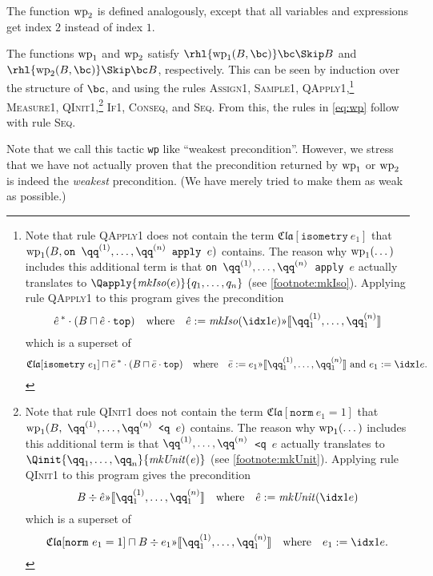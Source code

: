 \documentclass{article}
\renewcommand\ruleref[1]{rule \hbox{\textsc{#1}}}
\renewcommand\rulerefx[1]{\hbox{\textsc{#1}}}
\begin{document}
The function $\operatorname{wp}_2$
is defined analogously, except that all variables and expressions get
index $2$ instead of index $1$.

\medskip

The functions $\operatorname{wp}_1$
and $\operatorname{wp}_2$
satisfy $\rhl{\WP_1(B,\bc)}\bc\Skip B$
and $\rhl{\WP_2(B,\bc)}\Skip\bc B$,
respectively. This can be seen by induction over the structure of
$\bc$,
and using the rules \rulerefx{Assign1}, \rulerefx{Sample1},
\rulerefx{QApply1},\footnote{\label{footnote:wp.qapply}%
  Note that \ruleref{QApply1} does not
  contain the term $\mathfrak{Cla}[\mathtt{isometry}\ e_1]$
  that $\WP_1(B,\texttt{on $\qq^{(1)},\dots,\qq^{(n)}$
    apply $e$})$
  contains.  The reason why $\operatorname{wp}_1(\dots)$
  includes this additional term is that \texttt{on
    $\qq^{(1)},\dots,\qq^{(n)}$
    apply $e$}
  actually translates to $\Qapply{\mathit{mkIso}(e)}{q_1,\dots,q_n}$
  (see \autoref{footnote:mkIso}). Applying \ruleref{QApply1} to this
  program
  gives the precondition
  \[
    \hat e\,^* \cdot (B\sqcap \hat e\cdot\mathtt{top})
    \quad\text{where}\quad
    \hat e := \mathit{mkIso}(\idx1e)\text\guillemotright \llbracket\qq^{(1)}_1,\dots,\qq^{(n)}_1\rrbracket
  \]
  which is a superset of
  \[
    \mathfrak{Cla}[\mathtt{isometry}\ e_1] \sqcap \bar e\,^* \cdot (B\sqcap \bar e\cdot\mathtt{top})
    \quad\text{where}\quad
    \bar e := e_1\text\guillemotright \llbracket\qq^{(1)}_1,\dots,\qq^{(n)}_1\rrbracket
    \text{ and }e_1:=\idx1 e.
    \]
  } \rulerefx{Measure1}, \rulerefx{QInit1},\footnote{\label{footnote:wp.qinit}%
    Note that \ruleref{QInit1} does not contain the term $\mathfrak{Cla}[\mathtt{norm}\ e_1=1]$
    that $\WP_1(B,\  \texttt{$\qq^{(1)},\dots,\qq^{(n)}$ <q $e$})$ contains.
    The reason why $\operatorname{wp}_1(\dots)$ includes this additional term is that
    \texttt{$\qq^{(1)},\dots,\qq^{(n)}$ <q $e$} actually translates to $\Qinit{\qq_1,\dots,\qq_n}{\mathit{mkUnit(e)}}$
    (see \autoref{footnote:mkUnit}). Applying \ruleref{QInit1} to this program gives the precondition
    \[
      B\div \hat e \text\guillemotright \llbracket\qq^{(1)}_1,\dots,\qq^{(n)}_1\rrbracket
      \quad\text{where}\quad
      \hat e := \mathit{mkUnit}(\idx1e)
    \]
    which is a superset of
    \[
      \mathfrak{Cla}[\mathtt{norm}\ e_1=1] \sqcap B\div e_1 \text\guillemotright \llbracket\qq^{(1)}_1,\dots,\qq^{(n)}_1\rrbracket
      \quad\text{where}\quad
      e_1 := \idx1e.
    \]
    }
  \rulerefx{If1},
\rulerefx{Conseq}, and \rulerefx{Seq}. From this, the rules 
in \eqref{eq:wp} follow with \ruleref{Seq}.

Note that we call this tactic \texttt{wp} like ``weakest
precondition''. However, we stress that we have not actually proven that
the precondition returned by $\operatorname{wp}_1$
or $\operatorname{wp}_2$ is indeed the \emph{weakest} precondition.
(We have merely tried to make them as weak as possible.)
\end{document}

